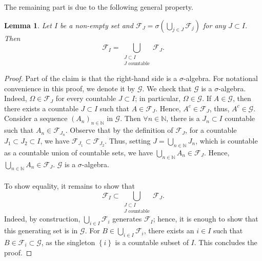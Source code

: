 \documentclass[11pt,a4paper,twoside,openany]{report}
\theoremstyle{plain} %
\newtheorem{lemma}[lemma]{Lemma}
\theoremstyle{definition} %
\theoremstyle{remark} %
\begin{document}
The remaining part is due to the following general property.
 \begin{lemma}\label{lemma:reduction to countable measurability}
     Let \(I\) be a non-empty set and \(\mathcal{F}_J=\sigma(\bigcup_{j\in J}\mathcal{F}_j)\) for any \(J\subset I\). Then 
     \begin{equation}
         \mathcal{F}_I=\bigcup_{\substack{J\subset I\\ J\text{ countable}}}\mathcal{F}_J.
     \end{equation}
 \end{lemma}
\begin{proof}
 Part of the claim is that the right-hand side is a \(\sigma\)-algebra. For notational convenience in this proof, we denote it by \(\mathcal{G}\). We check that \(\mathcal{G}\) is a \(\sigma\)-algebra.
 Indeed, \(\Omega\in \mathcal{F}_J\) for every countable \(J\subset I\); in particular, \(\Omega\in \mathcal{G}\). If \(A\in\mathcal{G}\), then there exists a countable \(J\subset I\) such that \(A\in\mathcal{F}_J\). Hence, \(A^c\in\mathcal{F}_J\), thus, \(A^c\in\mathcal{G}\). Consider a sequence \((A_n)_{n\in\mathbb{N}}\) in \(\mathcal{G}\). 
 Then \(\forall n\in\mathbb{N}\), there is a \(J_n\subset I\) countable such that \(A_n\in \mathcal{F}_{J_n}\). Observe that by the definition of \(\mathcal{F}_J\), for a countable \(J_1\subset J_2\subset I\), we have \(\mathcal{F}_{J_1}\subset\mathcal{F}_{J_2}\). Thus, setting \(J=\bigcup_{n\in\mathbb{N}}J_n\), which is countable as a countable union of countable sets, we have \(\bigcup_{n\in\mathbb{N}}A_n\in\mathcal{F}_J\). Hence, \(\bigcup_{n\in\mathbb{N}}A_n\in\mathcal{F}_{J}\). \(\mathcal{G}\) is a \(\sigma\)-algebra. 
 \\\\
 To show equality, it remains to show that 
 \begin{equation}
     \mathcal{F}_I\subset \bigcup_{\substack{J\subset I\\ J\text{ countable}}}\mathcal{F}_J.
 \end{equation}
Indeed, by construction, \(\bigcup_{i\in I}\mathcal{F}_i\) generates \(\mathcal{F}_I\); hence, it is enough to show that this generating set is in \(\mathcal{G}\). For \(B\in\bigcup_{i\in I}\mathcal{F}_i\), there exists an \(i\in I\) such that \(B\in \mathcal{F}_i\subset\mathcal{G}\), as the singleton \(\left\{i\right\}\) is a countable subset of \(I\). This concludes the proof. 
\end{proof}
 
\end{document}
